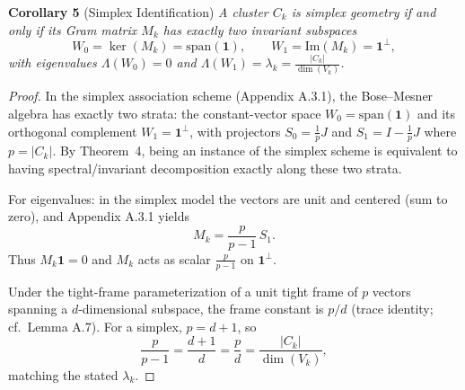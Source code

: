 \documentclass{article}
\theoremstyle{plain}
\numberwithin{equation}{section}
\theoremstyle{definition}
\theoremstyle{remark}
\begin{document}
\begin{lemmaproofbox}
\textbf{Corollary 5} (Simplex Identification)
\textit{A cluster $C_k$ is simplex geometry if and only if its Gram matrix $M_k$ has exactly two invariant subspaces
\[
W_0=\ker(M_k)=\mathrm{span}(\mathbf 1),
\qquad
W_1=\mathrm{Im}(M_k)=\mathbf 1^\perp,
\]
with eigenvalues $\Lambda(W_0)=0$ and $\Lambda(W_1)=\lambda_k=\frac{|C_k|}{\dim(V_k)}$.}
\begin{proof}\label{corollary:simplex}
In the simplex association scheme (Appendix A.3.1), the Bose--Mesner algebra has exactly two strata:
the constant-vector space $W_0=\mathrm{span}(\mathbf 1)$ and its orthogonal complement $W_1=\mathbf 1^\perp$,
with projectors $S_0=\frac{1}{p}J$ and $S_1=I-\frac{1}{p}J$ where $p=|C_k|$.
By Theorem~4, being an instance of the simplex scheme is equivalent to having spectral/invariant decomposition exactly along these two strata.

For eigenvalues: in the simplex model the vectors are unit and centered (sum to zero), and Appendix A.3.1 yields
\[
M_k = \frac{p}{p-1}\,S_1.
\]
Thus $M_k\mathbf 1=0$ and $M_k$ acts as scalar $\frac{p}{p-1}$ on $\mathbf 1^\perp$.

Under the tight-frame parameterization of a unit tight frame of $p$ vectors spanning a $d$-dimensional subspace,
the frame constant is $p/d$ (trace identity; cf.\ Lemma A.7). For a simplex, $p=d+1$, so
\[
\frac{p}{p-1}=\frac{d+1}{d}=\frac{p}{d}=\frac{|C_k|}{\dim(V_k)},
\]
matching the stated $\lambda_k$.
\end{proof}
\end{lemmaproofbox}
\end{document}
